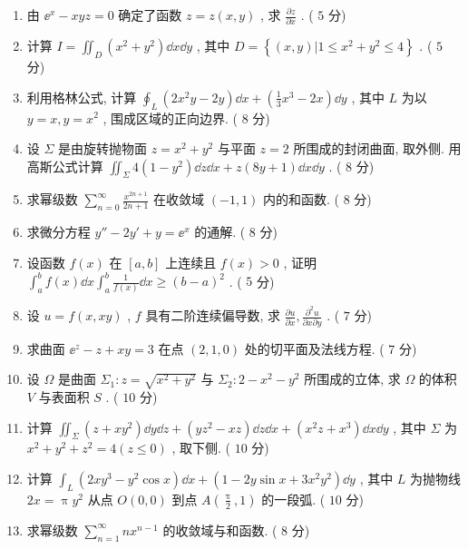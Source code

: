 \begin{enumerate}
	\item 由 $\ee^{x}-x y z=0$ 确定了函数 $z=z(x,y)$ , 求 $\frac{\partial z}{\partial x}$ . ( $5$ 分)
	
	\item 计算 $I=\iint_{D}\left(x^{2}+y^{2}\right) \dd x \dd y$ , 其中 $D=\left\{(x, y) | 1 \leq x^{2}+y^{2} \leq 4\right\}$ . ( $5$ 分)
	
	\item 利用格林公式, 计算 $\oint_{L}\left(2 x^{2} y-2 y\right) \dd x+\left(\frac{1}{3} x^{3}-2 x\right) \dd y$ , 其中 $L$ 为以 $y=x,y=x^{2}$ , 围成区域的正向边界. ( $8$ 分)
	
	\item 设 $\Sigma$ 是由旋转抛物面 $z=x^{2}+y^{2}$ 与平面 $z=2$ 所围成的封闭曲面, 取外侧. 用高斯公式计算 $\iint_{\Sigma} 4\left(1-y^{2}\right) \dd z \dd x+z(8 y+1) \dd x \dd y$ . ( $8$ 分)
	
	\item 求幂级数 $\sum_{n=0}^{\infty} \frac{x^{2 n+1}}{2 n+1}$ 在收敛域 $(-1,1)$ 内的和函数. ( $8$ 分)
	
	\item 求微分方程 $y''-2 y'+y=\ee^{x}$ 的通解. ( $8$ 分)
	
	\item 设函数 $f(x)$ 在 $[a,b]$ 上连续且 $f(x)>0$ , 证明 $\int_{a}^{b} f(x) \dd x \int_{a}^{b} \frac{1}{f(x)} \dd x \geq(b-a)^{2}$ . ( $5$ 分)

	\item 设 $u=f(x,xy)$ , $f$ 具有二阶连续偏导数, 求 $\frac{\partial u}{\partial x},\frac{\partial^2u}{\partial x\partial y}$ . ( $7$ 分)
	
	\item 求曲面 $\ee^{z}-z+x y=3$ 在点 $(2,1,0)$ 处的切平面及法线方程. ( $7$ 分)
	
	\item 设 $\Omega$ 是曲面 $\Sigma_1:z=\sqrt{x^2+y^2}$ 与 $\Sigma_2:2-x^2-y^2$ 所围成的立体, 求 $\Omega$ 的体积 $V$ 与表面积 $S$ . ( $10$ 分)
	
	\item 计算 $\iint_{\Sigma}\left(z+x y^{2}\right) \dd y \dd z+\left(y z^{2}-x z\right) \dd z \dd x+\left(x^{2} z+x^{3}\right) \dd x \dd y$ , 其中 $\Sigma$ 为 $x^{2}+y^{2}+z^{2}=4(z \leq 0)$ , 取下侧. ( $10$ 分)
	
	\item 计算 $\int_{L}\left(2 x y^{3}-y^{2} \cos x\right) \dd x+\left(1-2 y \sin x+3 x^{2} y^{2}\right) \dd y$ , 其中 $L$ 为抛物线 $2x=\uppi y^2$ 从点 $O(0,0)$ 到点 $A\left( \frac{\uppi}{2},1 \right)$ 的一段弧. ( $10$ 分)
	
	\item 求幂级数 $\sum_{n=1}^{\infty}nx^{n-1}$ 的收敛域与和函数. ( $8$ 分)
\end{enumerate}